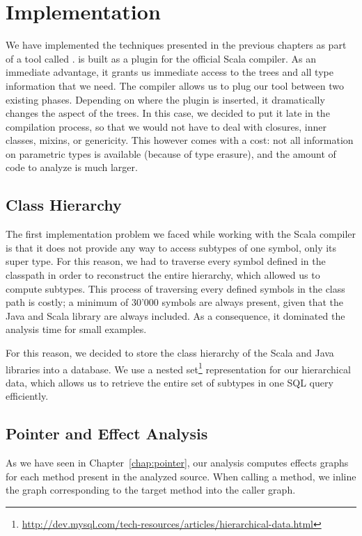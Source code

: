 \chapter{Implementation}
\label{chap:implementation}
We have implemented the techniques presented in the previous chapters as part
of a tool called {\insane}. {\insane} is built as a plugin for the official
Scala compiler. As an immediate advantage, it grants us immediate access to the
trees and all type information that we need. The compiler allows us to plug our
tool between two existing phases. Depending on where the plugin is inserted, it
dramatically changes the aspect of the trees. In this case, we decided to put
it late in the compilation process, so that we would not have to deal with
closures, inner classes, mixins, or genericity. This however comes with a cost:
not all information on parametric types is available (because of type erasure),
and the amount of code to analyze is much larger.

\section{Class Hierarchy}
The first implementation problem we faced while working with the Scala compiler
is that it does not provide any way to access subtypes of one symbol, only its
super type. For this reason, we had to traverse every symbol defined in the
classpath in order to reconstruct the entire hierarchy, which allowed us to
compute subtypes. This process of traversing every defined symbols in the class
path is costly; a minimum of 30'000 symbols are always present, given that the
Java and Scala library are always included. As a consequence, it dominated the
analysis time for small examples.

For this reason, we decided to store the class hierarchy of the Scala and Java
libraries into a database. We use a nested
set\footnote{\url{http://dev.mysql.com/tech-resources/articles/hierarchical-data.html}}
representation for our hierarchical data, which allows us to retrieve the entire
set of subtypes in one SQL query efficiently.

\section{Pointer and Effect Analysis}
As we have seen in Chapter~\ref{chap:pointer}, our analysis computes effects
graphs for each method present in the analyzed source. When calling a method,
we inline the graph corresponding to the target method into the caller graph.

